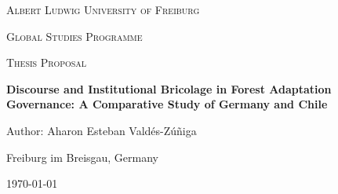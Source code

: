 \begin{titlepage}
  \thispagestyle{empty}
  \centering

  {\LARGE \textsc{Albert Ludwig University of Freiburg}\par}
  \vspace{0.5em}
  {\Large \textsc{Global Studies Programme}\par}
  \vspace{0.25em}
  {\large \textsc{Thesis Proposal}\par}

  \vspace{3cm}
  {\huge\bfseries Discourse and Institutional Bricolage in Forest Adaptation Governance: A Comparative Study of Germany and Chile \par}

  \vspace{2cm}
  {\Large Author: Aharon Esteban Valdés-Zúñiga\par}

  \vfill
  {\large Freiburg im Breisgau, Germany\par}
  {\large \today\par}
\end{titlepage}

